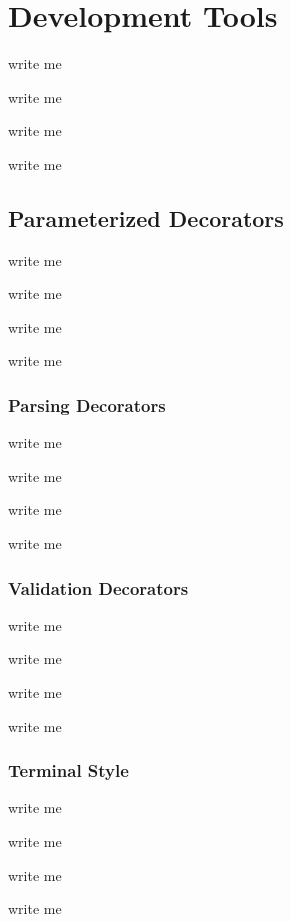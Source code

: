 \documentclass[letterpaper,10pt,english]{sphinxmanual}
\begin{document}
\chapter{Development Tools}
\label{\detokenize{DevTools:development-tools}}\label{\detokenize{DevTools::doc}}
\begin{DUlineblock}{0em}
\item[] write me
\item[] write me
\item[] write me
\item[] write me
\end{DUlineblock}


\section{Parameterized Decorators}
\label{\detokenize{DevTools:parameterized-decorators}}
\begin{DUlineblock}{0em}
\item[] write me
\item[] write me
\item[] write me
\item[] write me
\end{DUlineblock}


\subsection{Parsing Decorators}
\label{\detokenize{DevTools:parsing-decorators}}
\begin{DUlineblock}{0em}
\item[] write me
\item[] write me
\item[] write me
\item[] write me
\end{DUlineblock}


\subsection{Validation Decorators}
\label{\detokenize{DevTools:validation-decorators}}
\begin{DUlineblock}{0em}
\item[] write me
\item[] write me
\item[] write me
\item[] write me
\end{DUlineblock}


\subsection{Terminal Style}
\label{\detokenize{DevTools:terminal-style}}
\begin{DUlineblock}{0em}
\item[] write me
\item[] write me
\item[] write me
\item[] write me
\end{DUlineblock}
\end{document}

